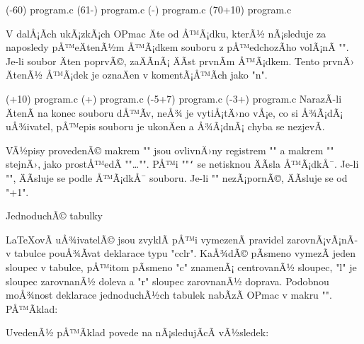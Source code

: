 \begtt
\verbinput (-60) program.c   % vÃ½pis od zaÄÃ¡tku souboru do Å™Ã¡dku 60
\verbinput (61-) program.c   % vÃ½pis od Å™Ã¡dku 61 do konce souboru
\verbinput (-) program.c     % vÃ½pis celÃ©ho souboru
\verbinput (70+10) program.c % vÃ½pis od Å™Ã¡dku 70, tiskne 10 Å™Ã¡dkÅ¯
\endtt

V dalÅ¡Ã­ch ukÃ¡zkÃ¡ch OPmac Äte od Å™Ã¡dku, kterÃ½ nÃ¡sleduje za naposledy
pÅ™eÄtenÃ½m Å™Ã¡dkem souboru z pÅ™edchozÃ­ho volÃ¡nÃ­ "\verbinput". Je-li soubor
Äten poprvÃ©, zaÄÃ­nÃ¡ ÄÃ­st prvnÃ­m Å™Ã¡dkem. Tento prvnÄ› ÄtenÃ½ 
Å™Ã¡dek je oznaÄen v komentÃ¡Å™Ã­ch jako "n".

\begtt
\verbinput (+10) program.c  % vÃ½pis deseti Å™Ã¡dkÅ¯ od Å™Ã¡dku n
\verbinput (+) program.c    % vÃ½pis od Å™Ã¡dku n do konce souboru
\vebrinput (-5+7) program.c %
\verbinput (-3+) program.c  % vynechÃ¡ 3 Å™Ã¡dky, tiskne do konce souboru
\endtt
%
NarazÃ­-li ÄtenÃ­ na konec souboru dÅ™Ã­v, neÅ¾ je vytiÅ¡tÄ›no vÅ¡e, co si Å¾Ã¡dÃ¡
uÅ¾ivatel, pÅ™epis souboru je ukonÄen a Å¾Ã¡dnÃ¡ chyba se nezjevÃ­. 

VÃ½pisy provedenÃ© makrem "\verbinput" jsou ovlivnÄ›ny registrem
"\ttindent" a makrem "\tthook" stejnÄ›, jako prostÅ™edÃ­ "\begtt"\dots"\endtt".
PÅ™i "\ttline"{\tt\char`} se netisknou ÄÃ­sla Å™Ã¡dkÅ¯. Je-li "", ÄÃ­sluje se podle
Å™Ã¡dkÅ¯ souboru. Je-li "\ttline" nezÃ¡pornÃ©, ÄÃ­sluje se od "\ttline+1".


\sec JednoduchÃ© tabulky

\LaTeX{}ovÃ­ uÅ¾ivatelÃ© jsou zvyklÃ­ pÅ™i vymezenÃ­ pravidel zarovnÃ¡vÃ¡nÃ­ v
tabulce pouÅ¾Ã­vat deklarace typu "{cclr}". KaÅ¾dÃ© pÃ­smeno vymezÃ­ jeden sloupec
v tabulce, pÅ™itom pÃ­smeno "c" znamenÃ¡ centrovanÃ½ sloupec, "l" je sloupec
zarovnanÃ½ doleva a "r" sloupec zarovnanÃ½ doprava.
Podobnou moÅ¾nost deklarace jednoduchÃ½ch tabulek nabÃ­zÃ­
OPmac v makru "". PÅ™Ã­klad:

\begtt
{}
\endtt

UvedenÃ½ pÅ™Ã­klad povede na nÃ¡sledujÃ­cÃ­ vÃ½sledek:

\medskip
\hfil{}
\medskip

